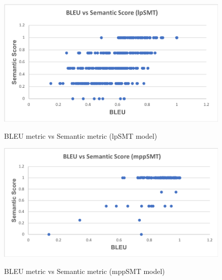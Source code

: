 \begin{figure}
\caption{BLEU metric vs Semantic metric (lpSMT model)}
\centering
\includegraphics[scale=0.5]{img/bleuvssemantic_lpSMT.png}
\label{fig:BleuSemlpSMT}
\end{figure}

\begin{figure}
\caption{BLEU metric vs Semantic metric (mppSMT model)}
\centering
\includegraphics[scale=0.5]{img/bleuvssemantic_mppSMT.png}
\label{fig:BleuSemMppSMT}
\end{figure}

